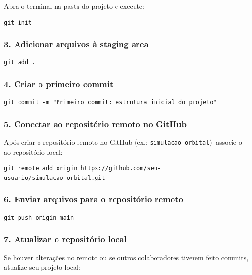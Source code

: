 Abra o terminal na pasta do projeto e execute:

\begin{lstlisting}[style=shellstyle]
git init
\end{lstlisting}

\subsubsection*{3. Adicionar arquivos à staging area}

\begin{lstlisting}[style=shellstyle]
git add .
\end{lstlisting}

\subsubsection*{4. Criar o primeiro commit}

\begin{lstlisting}[style=shellstyle]
git commit -m "Primeiro commit: estrutura inicial do projeto"
\end{lstlisting}

\subsubsection*{5. Conectar ao repositório remoto no GitHub}

Após criar o repositório remoto no GitHub (ex.: \texttt{simulacao\_orbital}), associe-o ao repositório local:

\begin{lstlisting}[style=shellstyle]
git remote add origin https://github.com/seu-usuario/simulacao_orbital.git
\end{lstlisting}

\subsubsection*{6. Enviar arquivos para o repositório remoto}

\begin{lstlisting}[style=shellstyle]
git push origin main
\end{lstlisting}

\subsubsection*{7. Atualizar o repositório local}

Se houver alterações no remoto ou se outros colaboradores tiverem feito commits, atualize seu projeto local:

